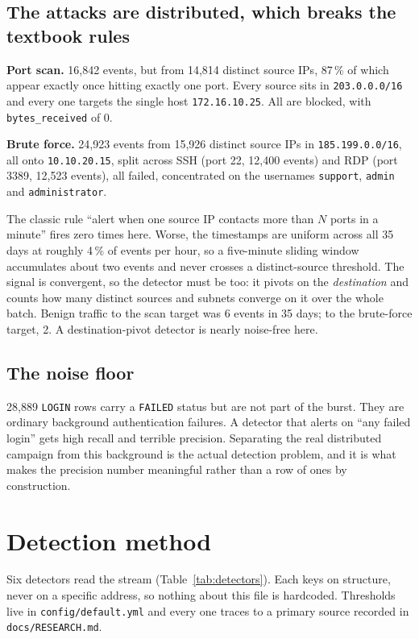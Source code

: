 \documentclass[11pt,a4paper]{article}
\newcommand{\code}[1]{\texttt{#1}}
\begin{document}
\subsection{The attacks are distributed, which breaks the textbook rules}

\textbf{Port scan.} 16,842 events, but from 14,814 distinct source IPs, 87\,\% of
which appear exactly once hitting exactly one port. Every source sits in
\code{203.0.0.0/16} and every one targets the single host \code{172.16.10.25}.
All are blocked, with \code{bytes\_received} of 0.

\textbf{Brute force.} 24,923 events from 15,926 distinct source IPs in
\code{185.199.0.0/16}, all onto \code{10.10.20.15}, split across SSH (port 22,
12,400 events) and RDP (port 3389, 12,523 events), all failed, concentrated on
the usernames \code{support}, \code{admin} and \code{administrator}.

The classic rule ``alert when one source IP contacts more than $N$ ports in a
minute'' fires zero times here. Worse, the timestamps are uniform across all 35
days at roughly 4\,\% of events per hour, so a five-minute sliding window
accumulates about two events and never crosses a distinct-source threshold. The
signal is convergent, so the detector must be too: it pivots on the
\emph{destination} and counts how many distinct sources and subnets converge on
it over the whole batch. Benign traffic to the scan target was 6 events in 35
days; to the brute-force target, 2. A destination-pivot detector is nearly
noise-free here.

\subsection{The noise floor}

28,889 \code{LOGIN} rows carry a \code{FAILED} status but are not part of the
burst. They are ordinary background authentication failures. A detector that
alerts on ``any failed login'' gets high recall and terrible precision.
Separating the real distributed campaign from this background is the actual
detection problem, and it is what makes the precision number meaningful rather
than a row of ones by construction.

\section{Detection method}

Six detectors read the stream (Table~\ref{tab:detectors}). Each keys on
structure, never on a specific address, so nothing about this file is
hardcoded. Thresholds live in \code{config/default.yml} and every one traces
to a primary source recorded in \code{docs/RESEARCH.md}.
\end{document}
